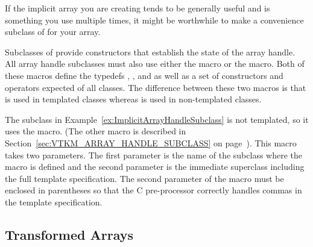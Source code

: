 

If the implicit array you are creating tends to be generally useful and is
something you use multiple times, it might be worthwhile to make a
convenience subclass of  for your array.


Subclasses of  provide constructors that
establish the state of the array handle. All array handle subclasses must
also use either the  macro or the
 macro. Both of these macros
define the typedefs , , and
 as well as a set of constructors and operators
expected of all  classes. The difference
between these two macros is that 
is used in templated classes whereas
 is used in non-templated
classes.

The  subclass in
Example~\ref{ex:ImplicitArrayHandleSubclass} is not templated, so it uses
the  macro. (The other macro
is described in Section~\ref{sec:VTKM_ARRAY_HANDLE_SUBCLASS} on
page~\pageref{sec:VTKM_ARRAY_HANDLE_SUBCLASS}). This macro takes two
parameters. The first parameter is the name of the subclass where the macro
is defined and the second parameter is the immediate superclass including
the full template specification. The second parameter of the macro must be
enclosed in parentheses so that the C pre-processor correctly handles
commas in the template specification.


\subsection{Transformed Arrays}
\label{sec:TransformedArrays}


